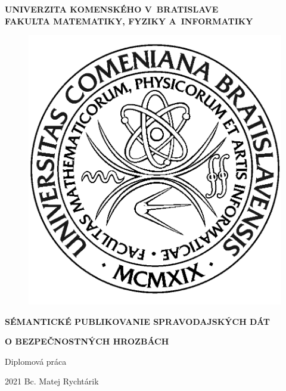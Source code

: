 \documentclass[12pt, a4paper, oneside]{book}
\newcommand\mftitle{Sémantické publikovanie spravodajských dát}
\newcommand\mftitlen{o bezpečnostných hrozbách}
\newcommand\mfthesistype{Diplomová práca}
\newcommand\mfauthor{Bc. Matej Rychtárik}
\newcommand\mfuniversity{UNIVERZITA KOMENSKÉHO V~BRATISLAVE}
\newcommand\mffaculty{FAKULTA MATEMATIKY, FYZIKY A~INFORMATIKY}
\begin{document}
\frontmatter

\thispagestyle{empty}

\noindent
\begin{minipage}{\textwidth}
\begin{center}
\textbf{\mfuniversity \\
\mffaculty}
\end{center}
\end{minipage}

\vfill
\begin{figure}[!hbt]
	\begin{center}
		\includegraphics{images/logo_fmph}
		\label{img:logo}
	\end{center}
\end{figure}
\begin{center}
	\begin{minipage}{0.8\textwidth}
		\centerline{\textbf{\large\MakeUppercase{\mftitle}}}
		\centerline{\textbf{\large\MakeUppercase{\mftitlen}}}
		\smallskip
		\centerline{\mfthesistype}
	\end{minipage}
\end{center}
\vfill
2021 \hfill
\mfauthor
\eject 

\thispagestyle{empty}
\end{document}
